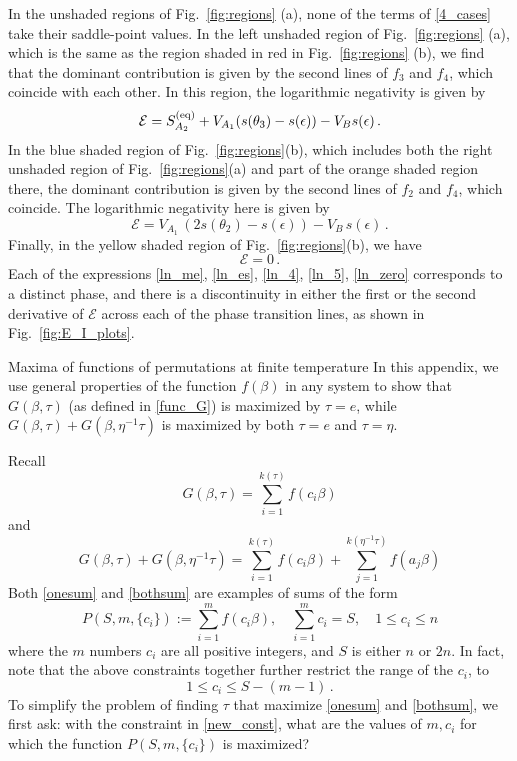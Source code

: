 \documentclass[a4paper,11pt]{article}
\newcommand{\be}{\begin{equation}}
\newcommand{\ee}{\end{equation}}
\newcommand\sE{{\ensuremath{{\mathcal E}}}}
\begin{document}
\begin{enumerate}
\begin{appendix}
In the unshaded regions of Fig.~\ref{fig:regions} (a), none of the terms of \eqref{4_cases} take their saddle-point values. In the left unshaded region of Fig.~\ref{fig:regions} (a), which is the same as the region shaded in red in Fig.~\ref{fig:regions} (b), we find that the dominant contribution is given by the second lines of $f_3$ and $f_4$, which coincide with each other. In this region, the logarithmic negativity is given by 
\be 
\sE = S^{\rm (eq)}_{A_2} + V_{A_1} (s(\theta_3)- s(\epsilon)) - V_B s(\epsilon) \,. 
\label{ln_4}
\ee
In the blue shaded region of Fig.~\ref{fig:regions}(b), which includes both the right unshaded region of Fig.~\ref{fig:regions}(a) and part of the orange shaded region there, the dominant contribution is given by the second lines of $f_2$ and $f_4$, which coincide. The logarithmic negativity here is given by 
\be 
\sE = V_{A_1} \, (2 s(\theta_2)- s(\epsilon)) - V_B \, s(\epsilon) \, . 
\label{ln_5}
\ee
Finally, in the yellow shaded region of Fig.~\ref{fig:regions}(b), we have 
\be 
\sE = 0 \, . \label{ln_zero}
\ee
Each of the expressions \eqref{ln_me}, \eqref{ln_es}, \eqref{ln_4}, \eqref{ln_5}, \eqref{ln_zero} corresponds to a distinct phase, and there is a discontinuity in either the first or the second derivative of $\sE$ across each of the phase transition lines, as shown in Fig.~\ref{fig:E_I_plots}. 



\begin{section}{Maxima of functions of permutations at finite temperature} 
\label{finitetemp_perms}
In this appendix, we use general properties of the function $f(\beta)$ in any system to show that $G(\beta, \tau)$ (as defined in \eqref{func_G}) is maximized by $\tau=e$, while $G(\beta, \tau) + G(\beta, \eta^{-1}\tau)$ is maximized by both $\tau=e$ and $\tau=\eta$. 

Recall 
\be 
G(\beta, \tau) = \sum_{i=1}^{k(\tau)} f(c_i \beta) \label{onesum}
\ee
and 
\be 
G(\beta, \tau) + G(\beta, \eta^{-1}\tau) = \sum_{i=1}^{k(\tau)} f(c_i \beta) + \sum_{j=1}^{k(\eta^{-1} \tau)} f(a_j \beta) \label{bothsum}
\ee
Both \eqref{onesum} and \eqref{bothsum} are examples of sums of the form
\be 
P(S, m, \{c_i\}):= \sum_{i=1}^m f(c_i \beta) , \quad \sum_{i=1}^m c_i = S, \quad 1 \leq c_i \leq n \label{ci_cond}
\ee 
where the $m$ numbers $c_i$ are all positive integers, and $S$ is either $n$ or $2n$. In fact, note that the above constraints together further restrict the range of the $c_i$, to
\be 
1 \leq c_i \leq S - (m-1) \, . \label{new_const}
\ee
To simplify the problem of finding $\tau$ that maximize \eqref{onesum} and \eqref{bothsum}, we first ask: with the constraint in \eqref{new_const}, what are the values of $m, c_i$ for which the function $P(S, m, \{c_i\})$ is maximized? 


\end{section}
\end{appendix}
\end{enumerate}
\end{document}
